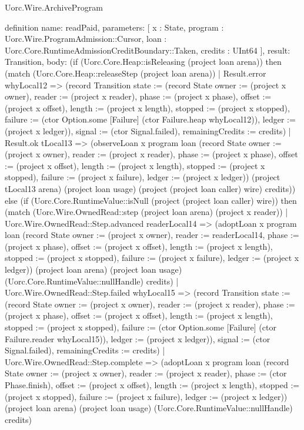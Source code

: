 \begin{lexlean}{Uorc.Wire.ArchiveProgram}
\begin{semanticmodule}
definition{
  name: readPaid,
  parameters: [
    x : State,
    program : Uorc.Wire.ProgramAdmission::Cursor,
    loan : Uorc.Core.RuntimeAdmissionCreditBoundary::Taken,
    credits : UInt64
  ],
  result: Transition,
  body: (if (Uorc.Core.Heap::isReleasing (project loan arena)) then (match (Uorc.Core.Heap::releaseStep (project loan arena))
    | Result.error whyLocal12 => (record Transition {state := (record State {owner := (project x owner), reader := (project x reader), phase := (project x phase), offset := (project x offset), length := (project x length), stopped := (project x stopped), failure := (ctor Option.some [Failure] (ctor Failure.heap whyLocal12)), ledger := (project x ledger)}), signal := (ctor Signal.failed), remainingCredits := credits})
    | Result.ok tLocal13 => (observeLoan x program loan (record State {owner := (project x owner), reader := (project x reader), phase := (project x phase), offset := (project x offset), length := (project x length), stopped := (project x stopped), failure := (project x failure), ledger := (project x ledger)}) (project tLocal13 arena) (project loan usage) (project (project loan caller) wire) credits)) else (if (Uorc.Core.RuntimeValue::isNull (project (project loan caller) wire)) then (match (Uorc.Wire.OwnedRead::step (project loan arena) (project x reader))
    | Uorc.Wire.OwnedRead::Step.advanced readerLocal14 => (adoptLoan x program loan (record State {owner := (project x owner), reader := readerLocal14, phase := (project x phase), offset := (project x offset), length := (project x length), stopped := (project x stopped), failure := (project x failure), ledger := (project x ledger)}) (project loan arena) (project loan usage) (Uorc.Core.RuntimeValue::nullHandle) credits)
    | Uorc.Wire.OwnedRead::Step.failed whyLocal15 => (record Transition {state := (record State {owner := (project x owner), reader := (project x reader), phase := (project x phase), offset := (project x offset), length := (project x length), stopped := (project x stopped), failure := (ctor Option.some [Failure] (ctor Failure.reader whyLocal15)), ledger := (project x ledger)}), signal := (ctor Signal.failed), remainingCredits := credits})
    | Uorc.Wire.OwnedRead::Step.complete => (adoptLoan x program loan (record State {owner := (project x owner), reader := (project x reader), phase := (ctor Phase.finish), offset := (project x offset), length := (project x length), stopped := (project x stopped), failure := (project x failure), ledger := (project x ledger)}) (project loan arena) (project loan usage) (Uorc.Core.RuntimeValue::nullHandle) credits)
}
\end{semanticmodule}
\end{lexlean}
